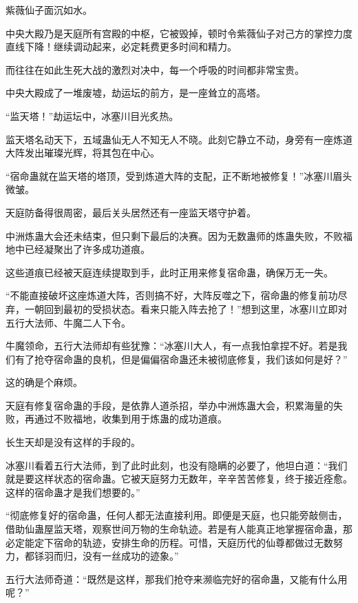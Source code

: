 
\begin{this_body}



紫薇仙子面沉如水。

中央大殿乃是天庭所有宫殿的中枢，它被毁掉，顿时令紫薇仙子对己方的掌控力度直线下降！继续调动起来，必定耗费更多时间和精力。

而往往在如此生死大战的激烈对决中，每一个呼吸的时间都非常宝贵。

中央大殿成了一堆废墟，劫运坛的前方，是一座耸立的高塔。

“监天塔！”劫运坛中，冰塞川目光炙热。

监天塔名动天下，五域蛊仙无人不知无人不晓。此刻它静立不动，身旁有一座炼道大阵发出璀璨光辉，将其包在中心。

“宿命蛊就在监天塔的塔顶，受到炼道大阵的支配，正不断地被修复！”冰塞川眉头微皱。

天庭防备得很周密，最后关头居然还有一座监天塔守护着。

中洲炼蛊大会还未结束，但只剩下最后的决赛。因为无数蛊师的炼蛊失败，不败福地中已经凝聚出了许多成功道痕。

这些道痕已经被天庭连续提取到手，此时正用来修复宿命蛊，确保万无一失。

“不能直接破坏这座炼道大阵，否则搞不好，大阵反噬之下，宿命蛊的修复前功尽弃，一朝回到最初的受损状态。看来只能入阵去抢了！”想到这里，冰塞川立即对五行大法师、牛魔二人下令。

牛魔领命，五行大法师却有些犹豫：“冰塞川大人，有一点我怕拿捏不好。若是我们有了抢夺宿命蛊的良机，但是偏偏宿命蛊还未被彻底修复，我们该如何是好？”

这的确是个麻烦。

天庭有修复宿命蛊的手段，是依靠人道杀招，举办中洲炼蛊大会，积累海量的失败，再通过不败福地，收集到用于炼蛊的成功道痕。

长生天却是没有这样的手段的。

冰塞川看着五行大法师，到了此时此刻，也没有隐瞒的必要了，他坦白道：“我们就是要这样状态的宿命蛊。它被天庭努力无数年，辛辛苦苦修复，终于接近痊愈。这样的宿命蛊才是我们想要的。”

“彻底修复好的宿命蛊，任何人都无法直接利用。即便是天庭，也只能旁敲侧击，借助仙蛊屋监天塔，观察世间万物的生命轨迹。若是有人能真正地掌握宿命蛊，那必定能定下宿命的轨迹，安排生命的历程。可惜，天庭历代的仙尊都做过无数努力，都铩羽而归，没有一丝成功的迹象。”

五行大法师奇道：“既然是这样，那我们抢夺来濒临完好的宿命蛊，又能有什么用呢？”


\end{this_body}
